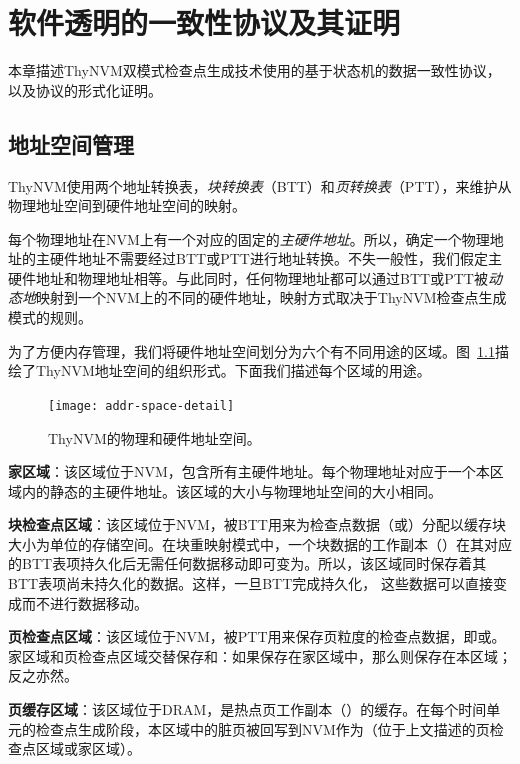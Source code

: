 \chapter{软件透明的一致性协议及其证明}
\label{chap:protocol}

本章描述ThyNVM双模式检查点生成技术使用的基于状态机的数据一致性协议，以及协议的形式化证明。

\section{地址空间管理}

ThyNVM使用两个地址转换表，\emph{块转换表}（BTT）和\emph{页转换表}（PTT），来维护从物理地址空间到硬件地址空间的映射。

每个物理地址在NVM上有一个对应的固定的\emph{主硬件地址}。所以，确定一个物理地址的主硬件地址不需要经过BTT或PTT进行地址转换。不失一般性，我们假定主硬件地址和物理地址相等。与此同时，任何物理地址都可以通过BTT或PTT被\emph{动态地}映射到一个NVM上的不同的硬件地址，映射方式取决于ThyNVM检查点生成模式的规则。

为了方便内存管理，我们将硬件地址空间划分为六个有不同用途的区域。图~\ref{fig:addr-space-detail}描绘了ThyNVM地址空间的组织形式。下面我们描述每个区域的用途。

\begin{figure}[!ht]
\centering
\texttt{[image: addr-space-detail]}
\caption{ThyNVM的物理和硬件地址空间。}
\label{fig:addr-space-detail}
\end{figure}


\textbf{家区域}：该区域位于NVM，包含所有主硬件地址。每个物理地址对应于一个本区域内的静态的主硬件地址。该区域的大小与物理地址空间的大小相同。

\textbf{块检查点区域}：该区域位于NVM，被BTT用来为检查点数据（\cl[block]或\cp[block]）分配以缓存块大小为单位的存储空间。在块重映射模式中，一个块数据的工作副本（\wa[block]）在其对应的BTT表项持久化后无需任何数据移动即可变为\cl[block]。所以，该区域同时保存着其BTT表项尚未持久化的\wa[block]数据。这样，一旦BTT完成持久化， 这些数据可以直接变成\cl[block]而不进行数据移动。

\textbf{页检查点区域}：该区域位于NVM，被PTT用来保存页粒度的检查点数据，即\cl[page]或\cp[page]。
家区域和页检查点区域交替保存\cl[page]和\cp[page]：如果\cp[page]保存在家区域中，那么\cl[page]则保存在本区域；反之亦然。

\textbf{页缓存区域}：该区域位于DRAM，是热点页工作副本（\wa[page]）的缓存。在每个时间单元的检查点生成阶段，本区域中的脏页被回写到NVM作为\cl[page]（位于上文描述的页检查点区域或家区域）。

